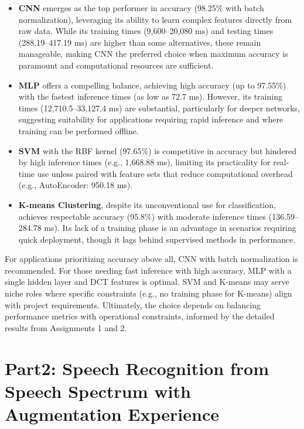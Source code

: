\documentclass[a4paper,12pt]{article}
\begin{document}
\begin{itemize}
    \item \textbf{CNN} emerges as the top performer in accuracy (98.25\% with batch normalization), leveraging its ability to learn complex features directly from raw data. While its training times (9,600–20,080 ms) and testing times (288.19–417.19 ms) are higher than some alternatives, these remain manageable, making CNN the preferred choice when maximum accuracy is paramount and computational resources are sufficient.
    
    \item \textbf{MLP} offers a compelling balance, achieving high accuracy (up to 97.55\%) with the fastest inference times (as low as 72.7 ms). However, its training times (12,710.5–33,127.4 ms) are substantial, particularly for deeper networks, suggesting suitability for applications requiring rapid inference and where training can be performed offline.
    
    \item \textbf{SVM} with the RBF kernel (97.65\%) is competitive in accuracy but hindered by high inference times (e.g., 1,668.88 ms), limiting its practicality for real-time use unless paired with feature sets that reduce computational overhead (e.g., AutoEncoder: 950.18 ms).
    
    \item \textbf{K-means Clustering}, despite its unconventional use for classification, achieves respectable accuracy (95.8\%) with moderate inference times (136.59–284.78 ms). Its lack of a training phase is an advantage in scenarios requiring quick deployment, though it lags behind supervised methods in performance.\\
\end{itemize}
For applications prioritizing accuracy above all, CNN with batch normalization is recommended. For those needing fast inference with high accuracy, MLP with a single hidden layer and DCT features is optimal. SVM and K-means may serve niche roles where specific constraints (e.g., no training phase for K-means) align with project requirements. Ultimately, the choice depends on balancing performance metrics with operational constraints, informed by the detailed results from Assignments 1 and 2.

\newpage

\section{Part2: Speech Recognition from Speech Spectrum with Augmentation Experience}
\end{document}
